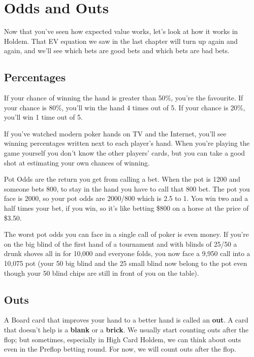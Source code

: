 \chapter{Odds and Outs}


Now that you've seen how expected value works, let's look at how it
works in Holdem. That EV equation we saw in the last chapter will turn
up again and again, and we'll see which bets are good bets and which
bets are bad bets.

\section{Percentages}

If your chance of winning the hand is greater than 50\%, you're the
favourite. If your chance is 80\%, you'll win the hand 4 times out of
5. If your chance is 20\%, you'll win 1 time out of 5.

If you've watched modern poker hands on TV and the Internet, you'll
see winning percentages written next to each player's hand. When
you're playing the game yourself you don't know the other players'
cards, but you can take a good shot at estimating your own chances of
winning.

Pot Odds are the return you get from calling a bet. When the pot is
1200 and someone bets 800, to stay in the hand you have to call that
800 bet. The pot you face is 2000, so your pot odds are 2000/800 which
is 2.5 to 1. You win two and a half times your bet, if you win, so
it's like betting \$800 on a horse at the price of \$3.50.

The worst pot odds you can face in a single call of poker is even
money. If you're on the big blind of the first hand of a tournament
and with blinds of 25/50 a drunk shoves all in for 10,000 and everyone
folds, you now face a 9,950 call into a 10,075 pot (your 50 big blind
and the 25 small blind now belong to the pot even though your 50 blind
chips are still in front of you on the table).

\section{Outs}

A Board card that improves your hand to a better hand is called an
\textbf{out}. A card that doesn't help is a \textbf{blank} or a
\textbf{brick}. We usually start counting outs after the flop; but
sometimes, especially in High Card Holdem, we can think about outs
even in the Preflop betting round. For now, we will count outs after
the flop.

